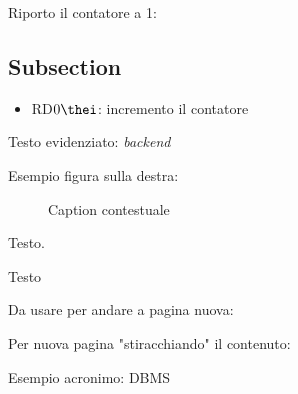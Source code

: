     Riporto il contatore a 1:
    \setcounter{i}{1}
    
    \subsection{Subsection \label{sec:labelsubsection}}
    \begin{itemize}
        \item RD$0\thei$: incremento il contatore 
        \label{lst:labellist}
    \end{itemize}
    
    Testo evidenziato: \textit{backend}

    Esempio figura sulla destra:
    
    \begin{wrapfigure}[5]{r}{2cm}
        \centering
        \def\svgwidth{1.5cm}
        
        \caption[Caption menu per immagine]{\unskip}
        
        \begin{small}
            Caption contestuale
        \end{small}
        \label{fig:labelimmagine}
    \end{wrapfigure}
    Testo.
    
    \bigskip
    Testo
    \bigskip\bigskip
    
    Da usare per andare a pagina nuova:
    \pagebreak

    Per nuova pagina "stiracchiando" il contenuto:
    \clearpage

    Esempio acronimo: \ac{DBMS}